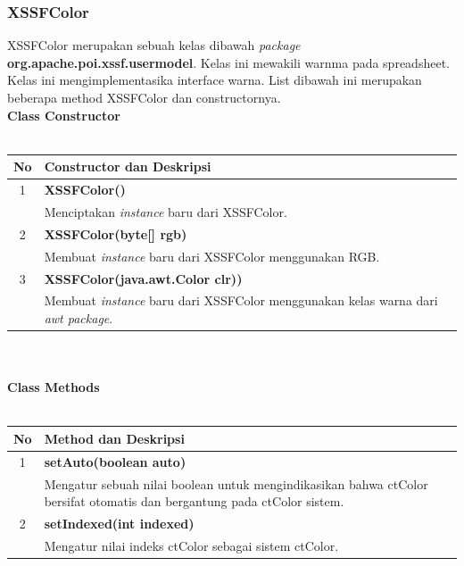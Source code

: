 \subsubsection{XSSFColor}
XSSFColor merupakan sebuah kelas dibawah \textit{package} \textbf{org.apache.poi.xssf.usermodel}. Kelas ini mewakili warnma pada spreadsheet. Kelas ini mengimplementasika interface warna. List dibawah ini merupakan beberapa method XSSFColor dan constructornya.\cite{apachepoi2}
\\
\noindent \textbf{Class Constructor}\\ \\
	\begin{tabular}{|c|p{12cm}|}
		\hline
		\textbf{No} & \textbf{Constructor dan Deskripsi} \\ \hline \hline
		1 & \textbf{XSSFColor()}\\
			&	Menciptakan \textit{instance} baru dari XSSFColor.\\ \hline
		2 & \textbf{XSSFColor(byte[] rgb)}\\
			&	Membuat  \textit{instance} baru dari XSSFColor menggunakan RGB.\\ \hline
		3 & \textbf{XSSFColor(java.awt.Color clr))}\\
			&	Membuat  \textit{instance} baru dari XSSFColor menggunakan kelas warna dari \textit{awt package}.\\ \hline 		
	\end{tabular}
\\ \\
\noindent \textbf{Class Methods}\\ \\
	\begin{tabular}{|c|p{12cm}|}
		\hline
		\textbf{No} & \textbf{Method dan Deskripsi} \\ \hline \hline
		1 & \textbf{setAuto(boolean auto)}\\
			&	Mengatur sebuah nilai boolean untuk mengindikasikan bahwa ctColor bersifat otomatis dan bergantung pada ctColor sistem.\\ \hline
		2 & \textbf{setIndexed(int indexed)}\\
			&	Mengatur nilai indeks ctColor sebagai sistem ctColor.\\ \hline
	\end{tabular}

